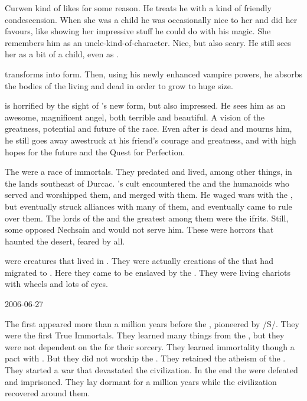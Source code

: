 Curwen kind of likes \Tiroco for some reason. 
He treats he with a kind of friendly condescension.
When she was a child he was occasionally nice to her and did her favours, like showing her impressive stuff he could do with his magic. 
She remembers him as an uncle-kind-of-character.
Nice, but also scary.
He still sees her as a bit of a child, even as \rinyuth.

\Teshrial transforms into \neoresphan form.
Then, using his newly enhanced vampire powers, he absorbs the bodies of the living and dead \ghobaleth in order to grow to huge size.

\Menessiaraid is horrified by the sight of \Teshrial's new form, but also impressed.
He sees him as an awesome, magnificent angel, both terrible and beautiful.
A vision of the greatness, potential and future of the \resphan race.
Even after \Teshrial is dead and \Menessiaraid mourns him, he still goes away awestruck at his friend's courage and greatness, and with high hopes for the future and the Quest for Perfection.

The \jinn were a race of immortals.
They predated \humans and lived, among other things, in the lands southeast of Durcac. 
\Secherdamon's cult encountered the \jinn and the humanoids who served and worshipped them, and merged with them.
He waged wars with the \jinn, but eventually struck alliances with many of them, and eventually came to rule over them.
The lords of the \jinn and the greatest among them were the ifrits.
Still, some \jinn opposed Nechsain and would not serve him. 
These  \jinn were horrors that haunted the desert, feared by all.

\Ophanim were creatures that lived in \Nyx.
They were actually creations of the \banes that had migrated to \Nyx.
Here they came to be enslaved by the \resphain.
They were living chariots with wheels and lots of eyes.



2006-06-27

The first \dragons appeared more than a million years before the \banewars, pioneered by \Sethicus/S\Sethicus/\Sethicuss.
They were the first True Immortals.
They learned many things from the \xss, but they were not dependent on the \xss for their sorcery.
They learned immortality though a pact with \KhothSell.
But they did not worship the \xss.
They retained the atheism of the \ophidians.
They started a war that devastated the \ophidian civilization.
In the end the \dragons were defeated and imprisoned.
They lay dormant for a million years while the \ophidian civilization recovered around them.

